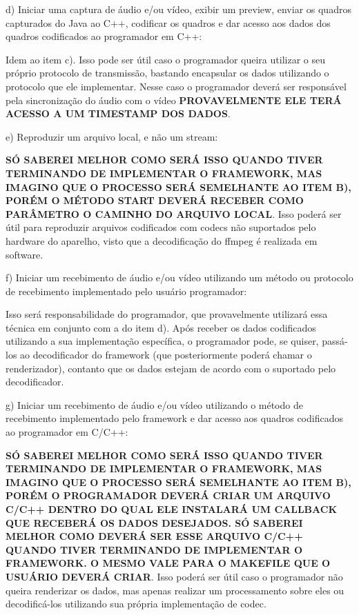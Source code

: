 \documentclass{acm_proc_article-sp}
\newcommand{\todo}[1]{\textcolor[rgb]{1.00,0.00,0.00}{\bf \uppercase{#1}}}
\begin{document}
d) Iniciar uma captura de áudio e/ou vídeo, exibir um preview, enviar os quadros capturados do Java ao C++, codificar os quadros e dar acesso aos dados dos quadros codificados ao programador em C++:

Idem ao item c). Isso pode ser útil caso o programador queira utilizar o seu próprio protocolo de transmissão, bastando encapsular os dados utilizando o protocolo que ele implementar. Nesse caso o programador deverá ser responsável pela sincronização do áudio com o vídeo \todo{provavelmente ele terá acesso a um timestamp dos dados}.

e) Reproduzir um arquivo local, e não um stream:

\todo{só saberei melhor como será isso quando tiver terminando de implementar o framework, mas imagino que o processo será semelhante ao item b), porém o método start deverá receber como parâmetro o caminho do arquivo local}. Isso poderá ser útil para reproduzir arquivos codificados com codecs não suportados pelo hardware do aparelho, visto que a decodificação do ffmpeg é realizada em software.

f) Iniciar um recebimento de áudio e/ou vídeo utilizando um método ou protocolo de recebimento implementado pelo usuário programador:

Isso será responsabilidade do programador, que provavelmente utilizará essa técnica em conjunto com a do item d). Após receber os dados codificados utilizando a sua implementação específica, o programador pode, se quiser, passá-los ao decodificador do framework  (que posteriormente poderá chamar o renderizador), contanto que os dados estejam de acordo com o suportado pelo decodificador.

g) Iniciar um recebimento de áudio e/ou vídeo utilizando o método de recebimento implementado pelo framework e dar acesso aos quadros codificados ao programador em C/C++:

\todo{só saberei melhor como será isso quando tiver terminando de implementar o framework, mas imagino que o processo será semelhante ao item b), porém o programador deverá criar um arquivo C/C++ dentro do qual ele instalará um callback que receberá os dados desejados. Só saberei melhor como deverá ser esse arquivo C/C++ quando tiver terminando de implementar o framework. O mesmo vale para o makefile que o usuário deverá criar}. Isso poderá ser útil caso o programador não queira renderizar os dados, mas apenas realizar um processamento sobre eles ou decodificá-los utilizando sua própria implementação de codec.
\end{document}
